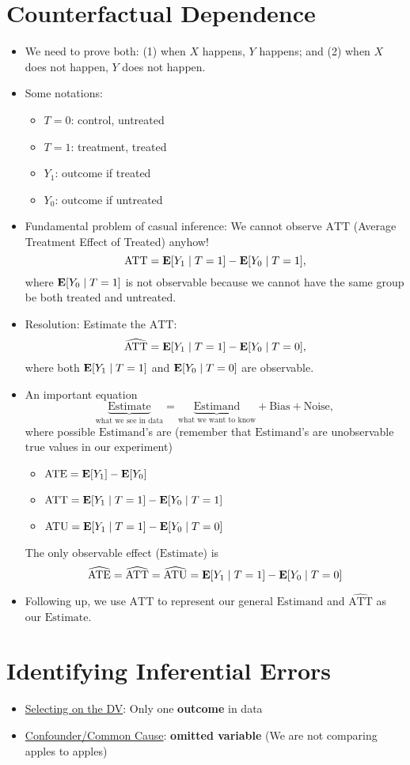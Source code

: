 \documentclass[10pt, letterpaper]{article}
\def\E{\vb{E}}
\def\ATT{\mathrm{ATT}}
\def\ATE{\mathrm{ATE}}
\def\ATU{\mathrm{ATU}}
\begin{document}
\begin{multicols}{2}
\section*{Counterfactual Dependence}
\begin{itemize}
	\item We need to prove both: (1) when $X$ happens, $Y$ happens; and (2) when $X$ does not happen, $Y$ does not happen. 
	\item Some notations:
	\begin{itemize}
		\item $T=0$: control, untreated
		\item $T=1$: treatment, treated
		\item $Y_1$: outcome if treated
		\item $Y_0$: outcome if untreated
	\end{itemize}
	\item Fundamental problem of casual inference: We cannot observe $\ATT$ (Average Treatment Effect of Treated) anyhow!  \[\ATT=\E\qty[Y_1\mid T=1]-\E\qty[Y_0\mid T=1],\] where $\E\qty[Y_0\mid T=1]$ is not observable because we cannot have the same group be both treated and untreated.  
	\item Resolution: Estimate the $\ATT$: \[\widehat{\ATT}=\E\qty[Y_1\mid T=1]-\E\qty[Y_0\mid T=0],\] where both $\E\qty[Y_1\mid T=1]$ and $\E\qty[Y_0\mid T=0]$ are observable.
	\item An important equation \[\underbrace{\boxed{\textrm{Estimate}}}_\text{what we see in data}=\underbrace{\boxed{\textrm{Estimand}}}_\text{what we want to know}+\textrm{Bias}+\textrm{Noise},\] where possible $\mathrm{Estimand}$'s are (remember that $\mathrm{Estimand}$'s are unobservable true values in our experiment)
	\begin{itemize}
		\item $\ATE=\E[Y_1]-\E[Y_0]$
		\item $\ATT=\E\qty[Y_1\mid T=1]-\E\qty[Y_0\mid T=1]$
		\item $\ATU=\E\qty[Y_1\mid T=1]-\E\qty[Y_0\mid T=0]$
	\end{itemize}
	The only observable effect ($\mathrm{Estimate}$) is \[\widehat{\ATE}=\widehat{\ATT}=\widehat{\ATU}=\E\qty[Y_1\mid T=1]-\E\qty[Y_0\mid T=0]\]
	\item Following up, we use $\ATT$ to represent our general $\mathrm{Estimand}$ and $\widehat{\ATT}$ as our $\mathrm{Estimate}$.
\end{itemize}

\section*{Identifying Inferential Errors}
\begin{itemize}
	\item \underline{Selecting on the DV}: Only one \textbf{outcome} in data
	\item \underline{Confounder/Common Cause}: \textbf{omitted variable} (We are not comparing apples to apples)
\end{itemize}


\end{multicols}
\end{document}
